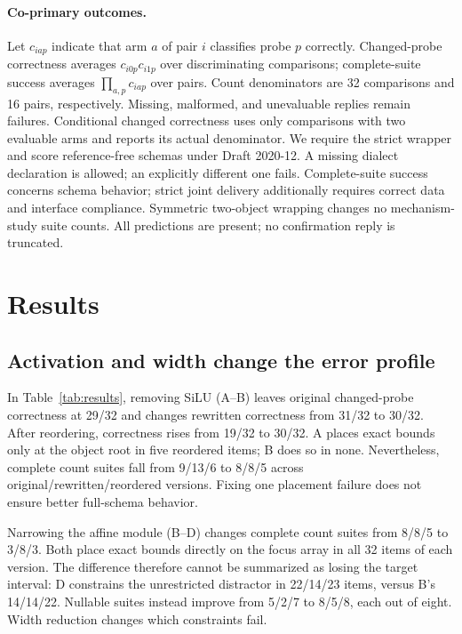 \paragraph{Co-primary outcomes.}
Let $c_{iap}$ indicate that arm $a$ of pair $i$ classifies probe $p$ correctly. Changed-probe correctness averages $c_{i0p}c_{i1p}$ over discriminating comparisons; complete-suite success averages $\prod_{a,p}c_{iap}$ over pairs. Count denominators are 32 comparisons and 16 pairs, respectively. Missing, malformed, and unevaluable replies remain failures. Conditional changed correctness uses only comparisons with two evaluable arms and reports its actual denominator. We require the strict wrapper and score reference-free schemas under Draft 2020-12. A missing dialect declaration is allowed; an explicitly different one fails. Complete-suite success concerns schema behavior; strict joint delivery additionally requires correct data and interface compliance. Symmetric two-object wrapping changes no mechanism-study suite counts. All predictions are present; no confirmation reply is truncated.

\section{Results}
\ResultsTable

\subsection{Activation and width change the error profile}
In Table~\ref{tab:results}, removing SiLU (A--B) leaves original changed-probe correctness at 29/32 and changes rewritten correctness from 31/32 to 30/32. After reordering, correctness rises from 19/32 to 30/32. A places exact bounds only at the object root in five reordered items; B does so in none. Nevertheless, complete count suites fall from 9/13/6 to 8/8/5 across original/rewritten/reordered versions. Fixing one placement failure does not ensure better full-schema behavior.

Narrowing the affine module (B--D) changes complete count suites from 8/8/5 to 3/8/3. Both place exact bounds directly on the focus array in all 32 items of each version. The difference therefore cannot be summarized as losing the target interval: D constrains the unrestricted distractor in 22/14/23 items, versus B's 14/14/22. Nullable suites instead improve from 5/2/7 to 8/5/8, each out of eight. Width reduction changes which constraints fail.

